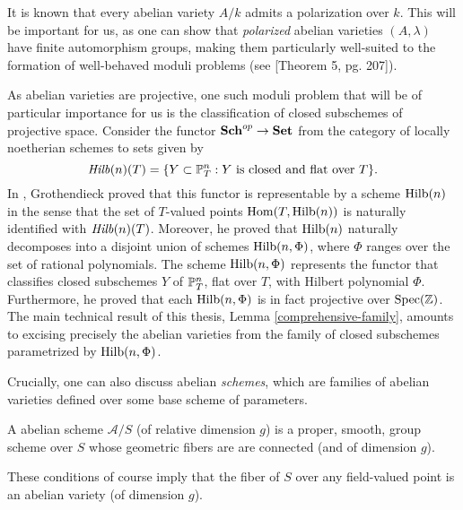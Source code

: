 It is known that every abelian variety $A/k$ admits a polarization over $k$. This will be important for us, as one can show that \emph{polarized} abelian varieties $(A,\lambda)$ have finite automorphism groups, making them particularly well-suited to the formation of well-behaved moduli problems (see \cite{mumfordAV}[Theorem 5, pg. 207]).

As abelian varieties are projective, one such moduli problem that will be of particular importance for us is the classification of closed subschemes of projective space. Consider the functor ${\normalfont\textbf{Sch}}^{op}\rightarrow {\normalfont\textbf{Set}}$ from the category of locally noetherian schemes to sets given by $$\operatorname{\mathit{Hilb}}(n)(T)=\{Y\subset \mathbb{P}^n_T: Y\text { is closed and flat over } T\}.$$ In \cite{FGAHilbert}, Grothendieck proved that this functor is representable by a scheme $\operatorname{Hilb}(n)$ in the sense that the set of $T$-valued points $\operatorname{Hom}(T,\operatorname{Hilb}(n))$ is naturally identified with $\operatorname{\mathit{Hilb}}(n)(T)$. Moreover, he proved that $\operatorname{Hilb}(n)$ naturally decomposes into a disjoint union of schemes $\operatorname{Hilb}(n,\Phi)$, where $\Phi$ ranges over the set of rational polynomials. The scheme $\operatorname{Hilb}(n,\Phi)$ represents the functor that classifies closed subschemes $Y$ of $\mathbb{P}^n_T$, flat over $T$, with Hilbert polynomial $\Phi$. Furthermore, he proved that each $\operatorname{Hilb}(n,\Phi)$ is in fact projective over $\operatorname{Spec}(\mathbb{Z})$. The main technical result of this thesis, Lemma \ref{comprehensive-family}, amounts to excising precisely the abelian varieties from the family of closed subschemes parametrized by $\operatorname{Hilb}(n,\Phi)$.

Crucially, one can also discuss abelian \emph{schemes}, which are families of abelian varieties defined over some base scheme of parameters. 

\begin{definition}
A abelian scheme $\mathcal{A}/S$ (of relative dimension $g$) is a proper, smooth, group scheme over $S$ whose geometric fibers are are connected (and of dimension $g$).
\end{definition}

These conditions of course imply that the fiber of $S$ over any field-valued point is an abelian variety (of dimension $g$).


